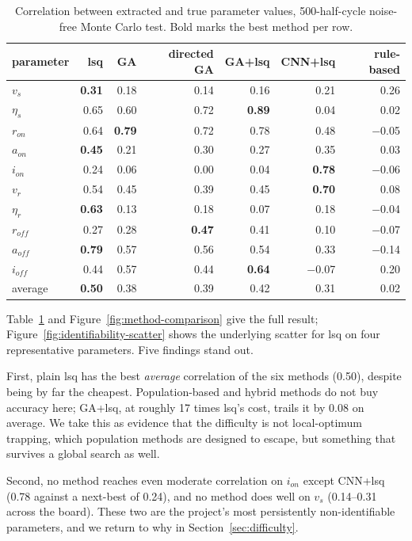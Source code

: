 \documentclass[11pt]{article}
\begin{document}
\begin{table}[t]
\centering
\small
\caption{Correlation between extracted and true parameter values, 500-half-cycle
noise-free Monte Carlo test. Bold marks the best method per row.}
\label{tab:montecarlo}
\begin{tabular}{lrrrrrr}
\toprule
parameter & lsq & GA & directed GA & GA+lsq & CNN+lsq & rule-based \\
\midrule
$v_s$     & \textbf{0.31} & 0.18 & 0.14 & 0.16 & 0.21 & 0.26 \\
$\eta_s$  & 0.65 & 0.60 & 0.72 & \textbf{0.89} & 0.04 & 0.02 \\
$r_{on}$  & 0.64 & \textbf{0.79} & 0.72 & 0.78 & 0.48 & $-$0.05 \\
$a_{on}$  & \textbf{0.45} & 0.21 & 0.30 & 0.27 & 0.35 & 0.03 \\
$i_{on}$  & 0.24 & 0.06 & 0.00 & 0.04 & \textbf{0.78} & $-$0.06 \\
$v_r$     & 0.54 & 0.45 & 0.39 & 0.45 & \textbf{0.70} & 0.08 \\
$\eta_r$  & \textbf{0.63} & 0.13 & 0.18 & 0.07 & 0.18 & $-$0.04 \\
$r_{off}$ & 0.27 & 0.28 & \textbf{0.47} & 0.41 & 0.10 & $-$0.07 \\
$a_{off}$ & \textbf{0.79} & 0.57 & 0.56 & 0.54 & 0.33 & $-$0.14 \\
$i_{off}$ & 0.44 & 0.57 & 0.44 & \textbf{0.64} & $-$0.07 & 0.20 \\
\midrule
average   & \textbf{0.50} & 0.38 & 0.39 & 0.42 & 0.31 & 0.02 \\
\bottomrule
\end{tabular}
\end{table}

Table~\ref{tab:montecarlo} and Figure~\ref{fig:method-comparison} give the
full result; Figure~\ref{fig:identifiability-scatter} shows the underlying
scatter for lsq on four representative parameters. Five findings stand out.

First, plain lsq has the best \emph{average} correlation of the six
methods (0.50), despite being by far the cheapest. Population-based and
hybrid methods do not buy accuracy here; GA+lsq, at roughly 17 times lsq's
cost, trails it by 0.08 on average. We take this as evidence that the
difficulty is not local-optimum trapping, which population methods are
designed to escape, but something that survives a global search as well.

Second, no method reaches even moderate correlation on $i_{on}$ except
CNN+lsq (0.78 against a next-best of 0.24), and no method does well on
$v_s$ (0.14--0.31 across the board). These two are the project's most
persistently non-identifiable parameters, and we return to why in
Section~\ref{sec:difficulty}.
\end{document}
